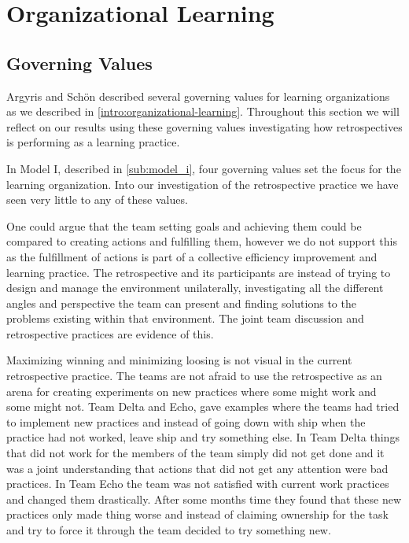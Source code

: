 \clearpage

\section{Organizational Learning} %
\label{sec:organizational_learning}
\subsection{Governing Values}
Argyris and Schön\cite{Argyris1996} described several governing values for learning organizations as we described in \autoref{intro:organizational-learning}. Throughout this section we will reflect on our results using these governing values investigating how retrospectives is performing as a learning practice. 

In Model I, described in \autoref{sub:model_i}, four governing values set the focus for the learning organization. Into our investigation of the retrospective practice we have seen very little to any of these values. 

One could argue that the team setting goals and achieving them could be compared to creating actions and fulfilling them, however we do not support this as the fulfillment of actions is part of a collective efficiency improvement and learning practice. The retrospective and its participants are instead of trying to design and manage the environment unilaterally, investigating all the different angles and perspective the team can present and finding solutions to the problems existing within that environment. The joint team discussion and retrospective practices are evidence of this. 

Maximizing winning and minimizing loosing is not visual in the current retrospective practice. The teams are not afraid to use the retrospective as an arena for creating experiments on new practices where some might work and some might not. Team Delta and Echo, gave examples where the teams had tried to implement new practices and instead of going down with ship when the practice had not worked, leave ship and try something else. In Team Delta things that did not work for the members of the team simply did not get done and it was a joint understanding that actions that did not get any attention were bad practices. In Team Echo the team was not satisfied with current work practices and changed them drastically. After some months time they found that these new practices only made thing worse and instead of claiming ownership for the task and try to force it through the team decided to try something new. 


